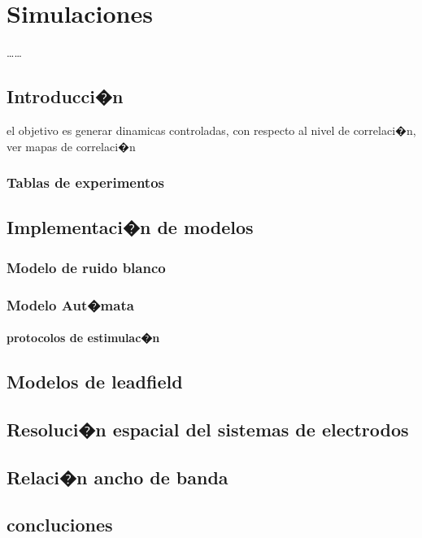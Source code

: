 \chapter{Simulaciones}
\begin{resumen}
\ldots\ldots
\end{resumen}

\section{Introducci�n}
el objetivo es generar dinamicas controladas, con respecto al nivel de
correlaci�n, ver mapas de correlaci�n

\subsection{Tablas de experimentos}

\section{Implementaci�n de modelos}
\subsection{Modelo de ruido blanco}
\subsection{Modelo Aut�mata}
\subsubsection{protocolos de estimulac�n}

\section{Modelos de leadfield}

\section{Resoluci�n espacial del sistemas de electrodos}
\section{Relaci�n ancho de banda}


\section{concluciones}

 